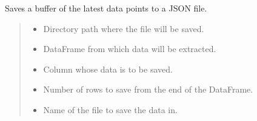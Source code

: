 \documentclass[letterpaper,10pt,english]{sphinxmanual}
\begin{document}
\begin{fulllineitems}
\label{\detokenize{docs/utilities:utilities.save_buffer}}
\pysigstartsignatures
{}
\pysigstopsignatures
\sphinxAtStartPar
Saves a buffer of the latest data points to a JSON file.
\begin{quote}\begin{description}
\begin{itemize}
\item {} 
\sphinxAtStartPar
{} \textendash{} Directory path where the file will be saved.

\item {} 
\sphinxAtStartPar
{} \textendash{} DataFrame from which data will be extracted.

\item {} 
\sphinxAtStartPar
{} \textendash{} Column whose data is to be saved.

\item {} 
\sphinxAtStartPar
{} \textendash{} Number of rows to save from the end of the DataFrame.

\item {} 
\sphinxAtStartPar
{} \textendash{} Name of the file to save the data in.

\end{itemize}

\end{description}\end{quote}

\end{fulllineitems}

\end{document}
